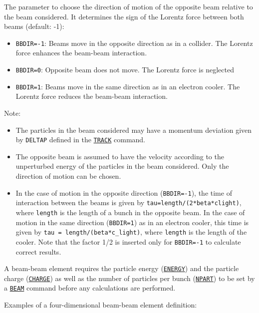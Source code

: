 \begin{madlist}
    The parameter to choose the direction of motion of the 
     opposite beam relative to the beam considered. It determines 
     the sign of the Lorentz force between both beams (default: -1): 
     \begin{itemize}
        \item  \texttt{BBDIR=-1}: Beams move in the opposite direction as in a 
        collider. The Lorentz force enhances the beam-beam interaction. 
        \item  \texttt{BBDIR=0}: Opposite beam does not move. The Lorentz force is 
        neglected 
        \item  \texttt{BBDIR=1}: Beams move in the same direction as in an 
        electron cooler. The Lorentz force reduces the beam-beam interaction. 
     \end{itemize}
     Note:  
     \begin{itemize}  
        \item  The particles in the beam considered may have a momentum 
        deviation given by \texttt{DELTAP} defined in the
        \hyperref[sec:track]{\texttt{TRACK}} command.  
        \item  The opposite beam is assumed to have the velocity according to 
        the unperturbed energy of the particles in the beam considered. Only 
        the direction of motion can be chosen. 
        \item  In the case of motion in the opposite direction
        (\texttt{BBDIR=-1}), the time of interaction between the beams
        is given by \texttt{tau=length/(2*beta*clight)}, where
        \texttt{length} is the length of a bunch in the opposite beam.
        In the case of motion in the same direction (\texttt{BBDIR=1})
        as in an electron cooler, this time is given by \texttt{tau =
        length/(beta*c\_light)}, where \texttt{length} is the length
        of the cooler. Note that the factor 1/2 is inserted only for
        \texttt{BBDIR=-1} to calculate correct results. 
     \end{itemize} 
\end{madlist}


A beam-beam element requires the particle energy
(\hyperref[sec:beam]{\texttt{ENERGY}})
and the particle charge
(\hyperref[sec:beam]{\texttt{CHARGE}})
as well as the number of particles per bunch 
(\hyperref[sec:beam]{\texttt{NPART}})
to be set by a \hyperref[sec:beam]{\texttt{BEAM}} command before any
calculations are performed. 


Examples of a four-dimensional beam-beam element definition:
 
